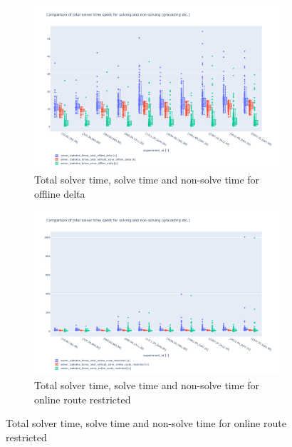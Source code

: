 \documentclass{article}
\begin{document}
\begin{figure}[hbtp]
\begin{subfigure}{\textwidth}
        \includegraphics[width=\textwidth]{Figures/04_computational_results/solve_non_solve_offline_delta.pdf}
        \caption{Total solver time, solve time and non-solve time for offline delta}
         \label{fig:computationtimes_solve_non_solve_time_online_delta}
    \end{subfigure}
    \begin{subfigure}{\textwidth}
        \includegraphics[width=\textwidth]{Figures/04_computational_results/solve_non_solve_online_route_restricted.pdf}
        \caption{Total solver time, solve time and non-solve time for online route restricted}
         \label{fig:computationtimes_solve_non_solve_time_online_route_restricted}
    \end{subfigure}
\end{figure}
\end{document}
